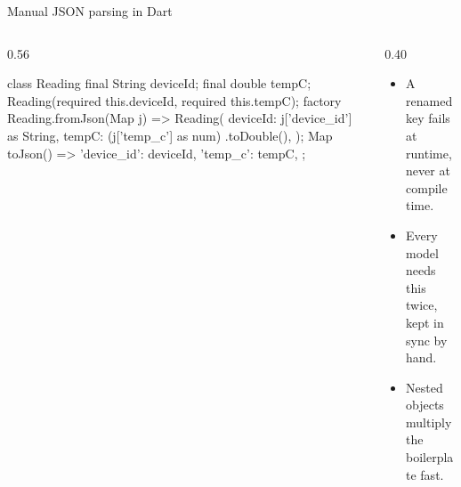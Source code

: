 \documentclass[10pt,aspectratio=169,t]{beamer}
\begin{document}
\begin{frame}[fragile,eyebrow=JSON]{Manual JSON parsing in Dart}
  \begin{columns}[T]
    \begin{column}{0.56\textwidth}
\begin{dart}
class Reading {
  final String deviceId; final double tempC;
  Reading({required this.deviceId,
      required this.tempC});
  factory Reading.fromJson(Map j) =>
      Reading(
        deviceId: j['device_id'] as String,
        tempC: (j['temp_c'] as num)
            .toDouble(),
      );
  Map toJson() => {
    'device_id': deviceId, 'temp_c': tempC,
  };
}
\end{dart}
    \end{column}
    \begin{column}{0.40\textwidth}
      \begin{itemize}
        \item A renamed key fails at runtime, never at compile time.
        \item Every model needs this twice, kept in sync by hand.
        \item Nested objects multiply the boilerplate fast.
      \end{itemize}
    \end{column}
  \end{columns}
\end{frame}
\end{document}
